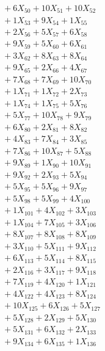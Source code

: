 \documentclass[a4paper,10pt]{article}
\begin{document}
{\begin{align}
&\;  + 6 X_{50} + 10 X_{51} + 10 X_{52} \\[0.3ex]
&\;  + 1 X_{53} + 9 X_{54} + 1 X_{55} \\[0.3ex]
&\;  + 2 X_{56} + 5 X_{57} + 6 X_{58} \\[0.3ex]
&\;  + 9 X_{59} + 5 X_{60} + 6 X_{61} \\[0.3ex]
&\;  + 3 X_{62} + 8 X_{63} + 8 X_{64} \\[0.3ex]
&\;  + 9 X_{65} + 2 X_{66} + 4 X_{67} \\[0.3ex]
&\;  + 7 X_{68} + 7 X_{69} + 10 X_{70} \\[0.5ex]\allowbreak
&\;  + 1 X_{71} + 1 X_{72} + 2 X_{73} \\[0.3ex]
&\;  + 1 X_{74} + 1 X_{75} + 5 X_{76} \\[0.3ex]
&\;  + 5 X_{77} + 10 X_{78} + 9 X_{79} \\[0.3ex]
&\;  + 6 X_{80} + 2 X_{81} + 8 X_{82} \\[0.3ex]
&\;  + 4 X_{83} + 7 X_{84} + 3 X_{85} \\[0.3ex]
&\;  + 7 X_{86} + 10 X_{87} + 5 X_{88} \\[0.3ex]
&\;  + 9 X_{89} + 1 X_{90} + 10 X_{91} \\[0.3ex]
&\;  + 9 X_{92} + 2 X_{93} + 5 X_{94} \\[0.3ex]
&\;  + 5 X_{95} + 5 X_{96} + 9 X_{97} \\[0.3ex]
&\;  + 5 X_{98} + 5 X_{99} + 4 X_{100} \\[0.5ex]\allowbreak
&\;  + 1 X_{101} + 4 X_{102} + 3 X_{103} \\[0.3ex]
&\;  + 1 X_{104} + 7 X_{105} + 3 X_{106} \\[0.3ex]
&\;  + 8 X_{107} + 8 X_{108} + 8 X_{109} \\[0.3ex]
&\;  + 3 X_{110} + 5 X_{111} + 9 X_{112} \\[0.3ex]
&\;  + 6 X_{113} + 5 X_{114} + 8 X_{115} \\[0.3ex]
&\;  + 2 X_{116} + 3 X_{117} + 9 X_{118} \\[0.3ex]
&\;  + 7 X_{119} + 4 X_{120} + 1 X_{121} \\[0.3ex]
&\;  + 4 X_{122} + 4 X_{123} + 8 X_{124} \\[0.3ex]
&\;  + 10 X_{125} + 6 X_{126} + 5 X_{127} \\[0.3ex]
&\;  + 5 X_{128} + 2 X_{129} + 5 X_{130} \\[0.5ex]\allowbreak
&\;  + 5 X_{131} + 6 X_{132} + 2 X_{133} \\[0.3ex]
&\;  + 9 X_{134} + 6 X_{135} + 1 X_{136} \\[0.3ex]

\end{align}}
\end{document}
